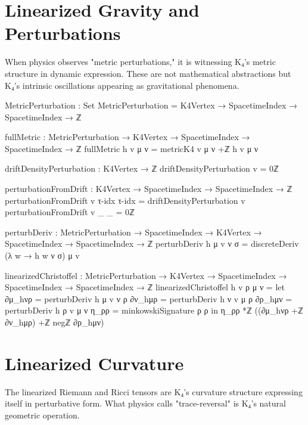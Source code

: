 \documentclass[11pt,a4paper]{book}
\begin{document}
\section{Linearized Gravity and Perturbations}

When physics observes "metric perturbations," it is witnessing K₄'s metric structure in dynamic expression. These are not mathematical abstractions but K₄'s intrinsic oscillations appearing as gravitational phenomena.

\begin{code}
MetricPerturbation : Set
MetricPerturbation = K4Vertex → SpacetimeIndex → SpacetimeIndex → ℤ

fullMetric : MetricPerturbation → K4Vertex → SpacetimeIndex → SpacetimeIndex → ℤ
fullMetric h v μ ν = metricK4 v μ ν +ℤ h v μ ν

driftDensityPerturbation : K4Vertex → ℤ
driftDensityPerturbation v = 0ℤ

perturbationFromDrift : K4Vertex → SpacetimeIndex → SpacetimeIndex → ℤ
perturbationFromDrift v τ-idx τ-idx = driftDensityPerturbation v
perturbationFromDrift v _     _     = 0ℤ

perturbDeriv : MetricPerturbation → SpacetimeIndex → K4Vertex → 
               SpacetimeIndex → SpacetimeIndex → ℤ
perturbDeriv h μ v ν σ = discreteDeriv (λ w → h w ν σ) μ v
\end{code}

\begin{code}
linearizedChristoffel : MetricPerturbation → K4Vertex → 
                        SpacetimeIndex → SpacetimeIndex → SpacetimeIndex → ℤ
linearizedChristoffel h v ρ μ ν = 
  let ∂μ_hνρ = perturbDeriv h μ v ν ρ
      ∂ν_hμρ = perturbDeriv h ν v μ ρ
      ∂ρ_hμν = perturbDeriv h ρ v μ ν
      η_ρρ = minkowskiSignature ρ ρ
  in η_ρρ *ℤ ((∂μ_hνρ +ℤ ∂ν_hμρ) +ℤ negℤ ∂ρ_hμν)
\end{code}

\section{Linearized Curvature}

The linearized Riemann and Ricci tensors are K₄'s curvature structure expressing itself in perturbative form. What physics calls "trace-reversal" is K₄'s natural geometric operation.
\end{document}
